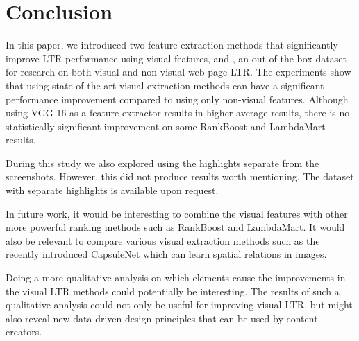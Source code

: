 
\section{Conclusion}
In this paper, we introduced two feature extraction methods that significantly improve \ac{LTR} performance using visual features, and \datasetname, an out-of-the-box dataset for research on both visual and non-visual web page \ac{LTR}.
The experiments show that using state-of-the-art visual extraction methods can have a significant performance improvement compared to using only non-visual features. Although using VGG-16 as a feature extractor results in higher average results, there is no statistically significant improvement on some RankBoost and LambdaMart results. 

 During this study we also explored using the highlights separate from the screenshots. However, this did not produce results worth mentioning. The dataset with separate highlights is available upon request. 
\fi

In future work, it would be interesting to combine the visual features with other more powerful ranking methods such as RankBoost and LambdaMart. It would also be relevant to compare various visual extraction methods such as the recently introduced CapsuleNet \cite{sabour2017dynamic} which can learn spatial relations in images.  

Doing a more qualitative analysis on which elements cause the improvements in the visual \ac{LTR} methods could potentially be interesting. The results of such a qualitative analysis could not only be useful for improving visual \ac{LTR}, but might also reveal new data driven design principles that can be used by content creators. 